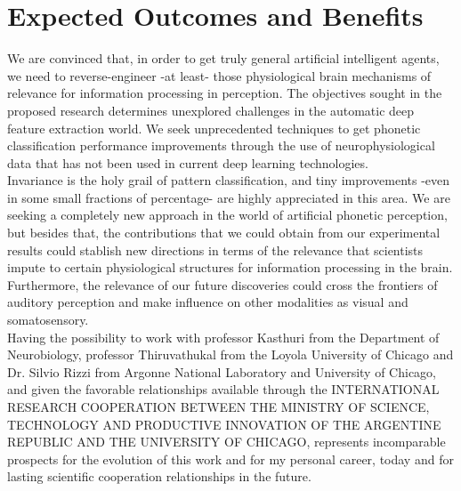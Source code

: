 \documentclass[11pt,a4paper]{article}
\begin{document}
\section{Expected Outcomes and Benefits}

We are convinced that, in order to get truly general 
artificial intelligent agents, we need to reverse-engineer
-at least- those physiological brain mechanisms of relevance
for information processing in perception.
The objectives sought in the proposed research
determines unexplored challenges in the automatic deep
feature extraction world.
We seek unprecedented techniques to get
phonetic classification performance improvements
through the use of neurophysiological data that has
not been used in current deep learning technologies. \\

Invariance is the holy grail of pattern classification,
and tiny improvements -even in some small fractions
of percentage- are highly appreciated in this area.
We are seeking a completely new approach in the world of
artificial phonetic perception, but besides that,
the contributions that we could obtain from our
experimental results could stablish new directions
in terms of the relevance that scientists impute
to certain physiological
structures for information processing in the brain.
Furthermore, the relevance of our future discoveries
could cross the frontiers of auditory perception
and make influence on other modalities
as visual and somatosensory. \\

Having the possibility to work with professor
Kasthuri from the Department of Neurobiology,
professor Thiruvathukal from the  Loyola University of Chicago and
Dr. Silvio Rizzi from Argonne National Laboratory and University of Chicago,
and given the favorable relationships available through the
INTERNATIONAL RESEARCH COOPERATION BETWEEN THE MINISTRY OF SCIENCE,
TECHNOLOGY AND PRODUCTIVE INNOVATION
OF THE ARGENTINE REPUBLIC
AND
THE UNIVERSITY OF CHICAGO,
represents incomparable prospects for the
evolution of this work and for my personal career,
today and for lasting scientific cooperation
relationships in the future. \\
\end{document}
